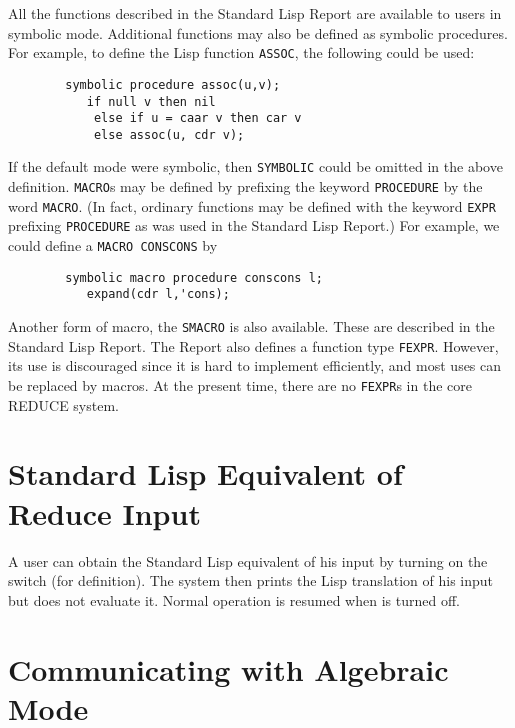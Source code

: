 All the functions described in the Standard Lisp Report are available to
users in symbolic mode. Additional functions may also be defined as
symbolic procedures. For example, to define the Lisp function \texttt{ASSOC},
the following could be used:
\begin{verbatim}
        symbolic procedure assoc(u,v);
           if null v then nil
            else if u = caar v then car v
            else assoc(u, cdr v);
\end{verbatim}
\hypertarget{reserved:MACRO}{}
\hypertarget{reserved:EXPR}{}
If the default mode were symbolic, then \texttt{SYMBOLIC} could be omitted in
the above definition. \texttt{MACRO}s may be defined by
prefixing the keyword \texttt{PROCEDURE} by the word \texttt{MACRO}.
(In fact, ordinary functions may be defined with the keyword \texttt{EXPR}
 prefixing \texttt{PROCEDURE} as was used in the Standard Lisp
Report.) For example, we could define a \texttt{MACRO CONSCONS} by
\begin{verbatim}
        symbolic macro procedure conscons l;
           expand(cdr l,'cons);
\end{verbatim}

\hypertarget{reserved:SMACRO}{}
\hypertarget{reserved:INLINE}{}
\hypertarget{reserved:FEXPR}{}
Another form of macro, the \texttt{SMACRO} is also available.
These are described in the Standard Lisp Report.  The Report also defines
a function type \texttt{FEXPR}.
However, its use is discouraged since it is hard to implement efficiently,
and most uses can be replaced by macros.  At the present time, there are
no \texttt{FEXPR}s in the core REDUCE system.

\section{Standard Lisp Equivalent of Reduce Input}
\hypertarget{switch:DEFN}{}

A user can obtain the Standard Lisp equivalent of his {\REDUCE} input by
turning on the switch  (for definition).  The
system then prints the Lisp translation of his input but does not evaluate
it.  Normal operation is resumed when  is turned off.

\section{Communicating with Algebraic Mode}
\hypertarget{command:SHARE}{}

